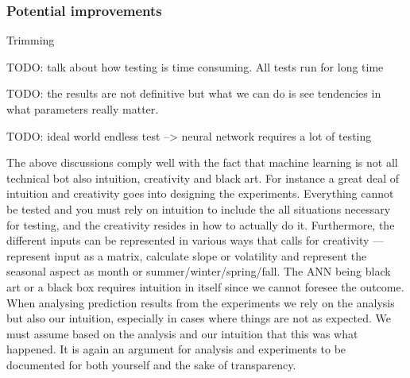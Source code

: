 
\subsubsection{Potential improvements}





Trimming


TODO: talk about how testing is time consuming. All tests run for long time

TODO: the results are not definitive but what we can do is see tendencies in what parameters really matter.

TODO: ideal world endless test --> neural network requires a lot of testing

The above discussions comply well with the fact that machine learning is not all technical bot also intuition, creativity and black art\cite{18}. For instance a great deal of intuition and creativity goes into designing the experiments. Everything cannot be tested and you must rely on intuition to include the all situations necessary for testing, and the creativity resides in how to actually do it. Furthermore, the different inputs can be represented in various ways that calls for creativity --- represent input as a matrix, calculate slope or volatility and represent the seasonal aspect as month or summer/winter/spring/fall. The ANN being black art or a black box requires intuition in itself since we cannot foresee the outcome. When analysing prediction results from the experiments we rely on the analysis but also our intuition, especially in cases where things are not as expected. We must assume based on the analysis and our intuition that this was what happened. It is again an argument for analysis and experiments to be documented for both yourself and the sake of transparency.





